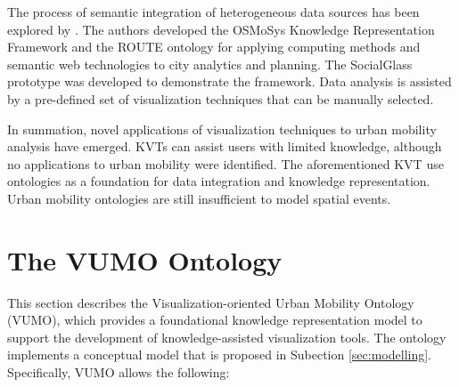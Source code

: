 \documentclass[]{interact}
\theoremstyle{plain}%
\theoremstyle{definition}
\theoremstyle{remark}
\theoremstyle{definition}
\begin{document}

The process of semantic integration of heterogeneous data sources has been explored by \citet{Psyllidis2016}. The authors developed the OSMoSys Knowledge Representation Framework and the ROUTE ontology for applying computing methods and semantic web technologies to city analytics and planning. The SocialGlass prototype was developed to demonstrate the framework. Data analysis is assisted by a pre-defined set of visualization techniques that can be manually selected.


In summation, novel applications of visualization techniques to urban mobility analysis have emerged. KVTs can assist users with limited knowledge, although no applications to urban mobility were identified. The aforementioned KVT use ontologies as a foundation for data integration and knowledge representation. Urban mobility ontologies are still insufficient to model spatial events.

\section{The VUMO Ontology}\label{sec:vumo}



This section describes the Visualization-oriented Urban Mobility Ontology (VUMO), which provides a foundational knowledge representation model to support the development of knowledge-assisted visualization tools. The ontology implements a conceptual model that is proposed in Subection \ref{sec:modelling}. Specifically, VUMO allows the following:
\end{document}
